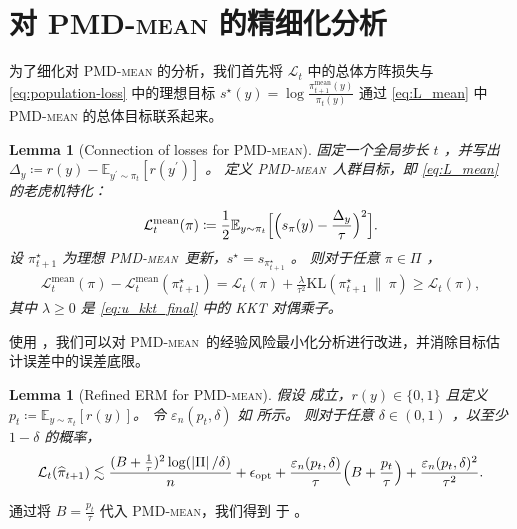 \documentclass{article}
\theoremstyle{plain}
\newtheorem{lemma}[theorem]{Lemma}
\theoremstyle{definition}
\theoremstyle{remark}
\newcommand{\pmdmean}{\textsc{PMD-mean}}
\newcommand{\KL}{\mathrm{KL}}
\newcommand{\E}{\mathbb{E}}
\newcommand{\abs}[1]{\left|#1\right|}
\begin{document}
\section{对 \textsc{PMD-mean} 的精细化分析}\label{sec:refined}
为了细化对 \textsc{PMD-mean} 的分析，我们首先将 $\mathcal{L}_t$ 中的总体方阵损失与 \eqref{eq:population-loss} 中的理想目标 $s^\star(y)=\log\frac{\pi_{t+1}^\mathrm{mean}(y)}{\pi_t(y)}$ 通过 \eqref{eq:L_mean} 中 \textsc{PMD-mean} 的总体目标联系起来。 
\begin{lemma}[Connection of losses for \pmdmean]\label{lem:pmdmean_quad_growth}
    固定一个全局步长 $t$ ，并写出 $\Delta_y\coloneqq r(y)-\E_{y^\prime\sim\pi_t}[r(y^\prime)]$ 。  
定义 \textsc{PMD-mean}\ 人群目标，即 \eqref{eq:L_mean} 的老虎机特化：
    \begin{align}\label{eq:L_mean_t}
        \mathcal{L}^{\mathrm{mean}}_t(\pi)
        \coloneqq\frac{1}{2}\E_{y\sim\pi_t}\Bigl[\Bigl(s_\pi(y)-\frac{\Delta_y}{\tau}\Bigr)^2\Bigr].
    \end{align}
    设 $\pi^\star_{t+1}$ 为理想 \textsc{PMD-mean}\ 更新，$s^\star=s_{\pi^\star_{t+1}}$ 。  
则对于任意 $\pi\in\Pi$ ，
    \begin{align}\label{eq:pmdmean_quad_growth}
        \mathcal{L}^{\mathrm{mean}}_t(\pi)-\mathcal{L}^{\mathrm{mean}}_t(\pi^\star_{t+1}) =\mathcal{L}_t(\pi) + \frac{\lambda}{\tau^2}\KL(\pi^\star_{t+1}~\|~\pi)\geq\mathcal{L}_t(\pi),
    \end{align}
    其中 $\lambda\geq 0$ 是 \eqref{eq:u_kkt_final} 中的 KKT 对偶乘子。
\end{lemma}

使用 ，我们可以对 \textsc{PMD-mean}\ 的经验风险最小化分析进行改进，并消除目标估计误差中的误差底限。 
\begin{lemma}[Refined ERM for \pmdmean]\label{lem:erm_pmdmean_constrained_refined}
    假设  成立，$r(y)\in\{0,1\}$ 且定义 $p_t\coloneqq \E_{y\sim\pi_t}[r(y)]$。
令 $\varepsilon_n(p_t,\delta)$ 如  所示。
则对于任意 $\delta\in(0,1)$ ，以至少 $1-\delta$ 的概率，
    \begin{align}\label{eq:erm_pmdmean_constrained_refined}
        \mathcal{L}_t(\widehat{\pi}_{t+1})
        \lesssim
        \frac{(B+\frac{1}{\tau})^2\log(\abs{\Pi}/\delta)}{n} +\epsilon_{\mathrm{opt}} +\frac{\varepsilon_n(p_t,\delta)}{\tau}\Bigl(B+\frac{p_t}{\tau}\Bigr) +\frac{\varepsilon_n(p_t,\delta)^2}{\tau^2}.
    \end{align}
\end{lemma}
通过将 $B=\frac{p_t}{\tau}$ 代入 \textsc{PMD-mean}，我们得到  于 。
\end{document}
